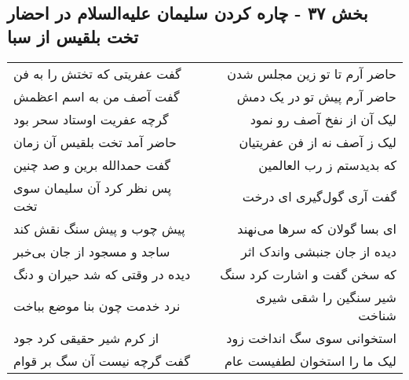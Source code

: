 \begin{center}
\section*{بخش ۳۷ - چاره کردن سلیمان علیه‌السلام در احضار تخت بلقیس از سبا}
\label{sec:sh037}
\begin{longtable}{l p{0.5cm} r}
گفت عفریتی که تختش را به فن
&&
حاضر آرم تا تو زین مجلس شدن
\\
گفت آصف من به اسم اعظمش
&&
حاضر آرم پیش تو در یک دمش
\\
گرچه عفریت اوستاد سحر بود
&&
لیک آن از نفخ آصف رو نمود
\\
حاضر آمد تخت بلقیس آن زمان
&&
لیک ز آصف نه از فن عفریتیان
\\
گفت حمدالله برین و صد چنین
&&
که بدیدستم ز رب العالمین
\\
پس نظر کرد آن سلیمان سوی تخت
&&
گفت آری گول‌گیری ای درخت
\\
پیش چوب و پیش سنگ نقش کند
&&
ای بسا گولان که سرها می‌نهند
\\
ساجد و مسجود از جان بی‌خبر
&&
دیده از جان جنبشی واندک اثر
\\
دیده در وقتی که شد حیران و دنگ
&&
که سخن گفت و اشارت کرد سنگ
\\
نرد خدمت چون بنا موضع بباخت
&&
شیر سنگین را شقی شیری شناخت
\\
از کرم شیر حقیقی کرد جود
&&
استخوانی سوی سگ انداخت زود
\\
گفت گرچه نیست آن سگ بر قوام
&&
لیک ما را استخوان لطفیست عام
\\
\end{longtable}
\end{center}
